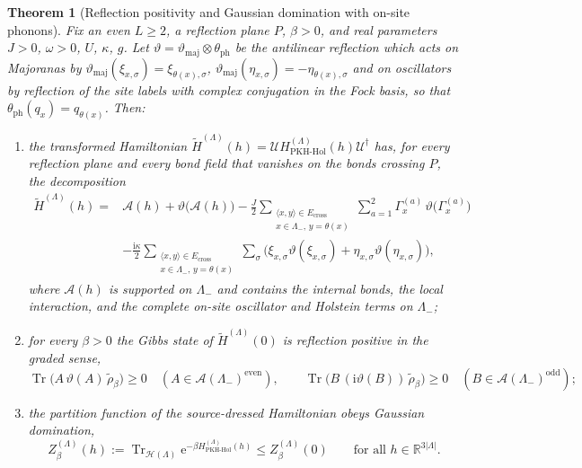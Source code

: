 \documentclass[11pt]{article}
\numberwithin{equation}{section}
\newcommand{\e}{\mathrm{e}}
\newcommand{\ii}{\mathrm{i}}
\newcommand{\Tr}{\operatorname{Tr}}
\newcommand{\R}{\mathbb{R}}
\newcommand{\Lamb}{\Lambda}
\newcommand{\ph}{\mathrm{ph}}
\newcommand{\maj}{\mathrm{maj}}
\newcommand{\PKH}{\mathrm{PKH\text{-}Hol}}
\newcommand{\Gam}{\Gamma}
\newtheorem{theorem}{Theorem}[section]
\theoremstyle{definition}
\begin{document}
\begin{theorem}[Reflection positivity and Gaussian domination with on-site phonons]\label{thm:rp}
Fix an even $L\ge2$, a reflection plane $P$, $\beta>0$, and real parameters
$J>0$, $\omega>0$, $U$, $\kappa$, $g$. Let $\vartheta=\vartheta_{\maj}\otimes\theta_{\ph}$
be the antilinear reflection which acts on Majoranas by
$\vartheta_{\maj}(\xi_{x,\sigma})=\xi_{\theta(x),\sigma}$,
$\vartheta_{\maj}(\eta_{x,\sigma})=-\eta_{\theta(x),\sigma}$ and on oscillators by
reflection of the site labels with complex conjugation in the Fock basis, so that
$\theta_{\ph}(q_{x})=q_{\theta(x)}$. Then:
\begin{enumerate}
\item the transformed Hamiltonian $\widetilde H^{(\Lamb)}(h)=\mathcal{U}H^{(\Lamb)}_{\PKH}(h)\mathcal{U}^{\dagger}$
  has, for every reflection plane and every bond field that vanishes on the bonds
  crossing $P$, the decomposition
  \begin{equation}
  \begin{aligned}
  \widetilde H^{(\Lamb)}(h)={}&\mathcal{A}(h)+\vartheta\big(\mathcal{A}(h)\big)
  -\frac{J}{2}\!\!\sum_{\substack{\langle x,y\rangle\in E_{\text{cross}}\\ x\in\Lamb_{-},\,y=\theta(x)}}\sum_{a=1}^{2}\Gam^{(a)}_{x}\,\vartheta\big(\Gam^{(a)}_{x}\big)\\
  &-\frac{\ii\kappa}{2}\!\!\sum_{\substack{\langle x,y\rangle\in E_{\text{cross}}\\ x\in\Lamb_{-},\,y=\theta(x)}}\sum_{\sigma}\Big(\xi_{x,\sigma}\vartheta(\xi_{x,\sigma})+\eta_{x,\sigma}\vartheta(\eta_{x,\sigma})\Big),
  \end{aligned}
  \label{eq:decomp}
  \end{equation}
  where $\mathcal{A}(h)$ is supported on $\Lamb_{-}$ and contains the internal bonds,
  the local interaction, and the complete on-site oscillator and Holstein terms on
  $\Lamb_{-}$;
\item for every $\beta>0$ the Gibbs state of $\widetilde H^{(\Lamb)}(0)$ is reflection
  positive in the graded sense,
  \begin{equation}
  \Tr\big(A\,\vartheta(A)\,\tilde\rho_{\beta}\big)\ge0\quad(A\in\mathcal{A}(\Lamb_{-})^{\text{even}}),
  \qquad
  \Tr\big(B\,(\ii\vartheta(B))\,\tilde\rho_{\beta}\big)\ge0\quad(B\in\mathcal{A}(\Lamb_{-})^{\text{odd}});
  \label{eq:rp}
  \end{equation}
\item the partition function of the source-dressed Hamiltonian obeys Gaussian domination,
  \begin{equation}
  Z^{(\Lamb)}_{\beta}(h):=\Tr_{\mathcal{H}(\Lamb)}\e^{-\beta H^{(\Lamb)}_{\PKH}(h)}
  \le Z^{(\Lamb)}_{\beta}(0)\qquad\text{for all }h\in\R^{3|\Lamb|}.
  \label{eq:gd}
  \end{equation}
\end{enumerate}
\end{theorem}
\end{document}
